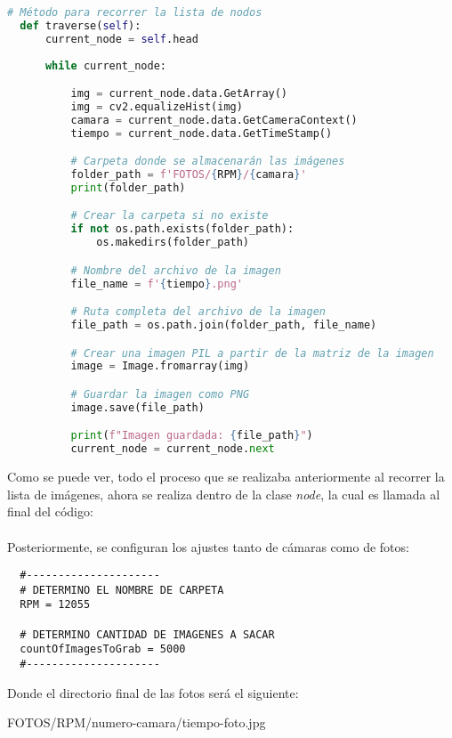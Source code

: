 \documentclass{article}
\begin{document}
\begin{lstlisting}[language=Python]
  # Método para recorrer la lista de nodos
  def traverse(self):
      current_node = self.head
      
      while current_node:

          img = current_node.data.GetArray()
          img = cv2.equalizeHist(img)
          camara = current_node.data.GetCameraContext()
          tiempo = current_node.data.GetTimeStamp()

          # Carpeta donde se almacenarán las imágenes
          folder_path = f'FOTOS/{RPM}/{camara}'
          print(folder_path)

          # Crear la carpeta si no existe
          if not os.path.exists(folder_path):
              os.makedirs(folder_path)

          # Nombre del archivo de la imagen
          file_name = f'{tiempo}.png'

          # Ruta completa del archivo de la imagen
          file_path = os.path.join(folder_path, file_name)

          # Crear una imagen PIL a partir de la matriz de la imagen
          image = Image.fromarray(img)

          # Guardar la imagen como PNG
          image.save(file_path)

          print(f"Imagen guardada: {file_path}")
          current_node = current_node.next
\end{lstlisting}

\noindent Como se puede ver, todo el proceso que se realizaba anteriormente al recorrer la lista de imágenes, ahora
se realiza dentro de la clase \textit{node}, la cual es llamada al final del código:
\\ \\
Posteriormente, se configuran los ajustes tanto de cámaras como de fotos:

\begin{lstlisting}
  #---------------------
  # DETERMINO EL NOMBRE DE CARPETA
  RPM = 12055

  # DETERMINO CANTIDAD DE IMAGENES A SACAR
  countOfImagesToGrab = 5000
  #---------------------
\end{lstlisting}

\noindent Donde el directorio final de las fotos será el siguiente:

\begin{center}
  FOTOS/RPM/numero-camara/tiempo-foto.jpg
\end{center}
\end{document}
